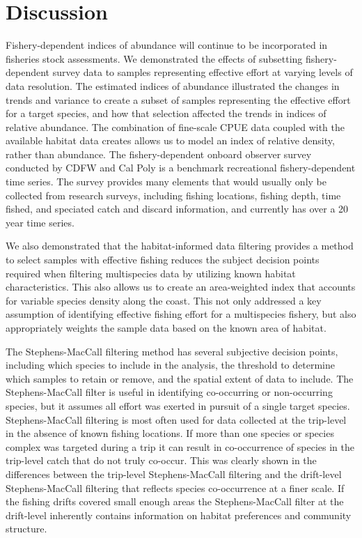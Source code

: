 \documentclass[
  12pt,
  authoryear,
  preprint,
  3p]{elsarticle}
\begin{document}
\FloatBarrier

\hypertarget{discussion}{%
\section{Discussion}\label{discussion}}

Fishery-dependent indices of abundance will continue to be incorporated
in fisheries stock assessments. We demonstrated the effects of
subsetting fishery-dependent survey data to samples representing
effective effort at varying levels of data resolution. The estimated
indices of abundance illustrated the changes in trends and variance to
create a subset of samples representing the effective effort for a
target species, and how that selection affected the trends in indices of
relative abundance. The combination of fine-scale CPUE data coupled with
the available habitat data creates allows us to model an index of
relative density, rather than abundance. The fishery-dependent onboard
observer survey conducted by CDFW and Cal Poly is a benchmark
recreational fishery-dependent time series. The survey provides many
elements that would usually only be collected from research surveys,
including fishing locations, fishing depth, time fished, and speciated
catch and discard information, and currently has over a 20 year time
series.

We also demonstrated that the habitat-informed data filtering provides a
method to select samples with effective fishing reduces the subject
decision points required when filtering multispecies data by utilizing
known habitat characteristics. This also allows us to create an
area-weighted index that accounts for variable species density along the
coast. This not only addressed a key assumption of identifying effective
fishing effort for a multispecies fishery, but also appropriately
weights the sample data based on the known area of habitat.

The Stephens-MacCall filtering method has several subjective decision
points, including which species to include in the analysis, the
threshold to determine which samples to retain or remove, and the
spatial extent of data to include. The Stephens-MacCall filter is useful
in identifying co-occurring or non-occurring species, but it assumes all
effort was exerted in pursuit of a single target species.
Stephens-MacCall filtering is most often used for data collected at the
trip-level in the absence of known fishing locations. If more than one
species or species complex was targeted during a trip it can result in
co-occurrence of species in the trip-level catch that do not truly
co-occur. This was clearly shown in the differences between the
trip-level Stephens-MacCall filtering and the drift-level
Stephens-MacCall filtering that reflects species co-occurrence at a
finer scale. If the fishing drifts covered small enough areas the
Stephens-MacCall filter at the drift-level inherently contains
information on habitat preferences and community structure.
\end{document}
